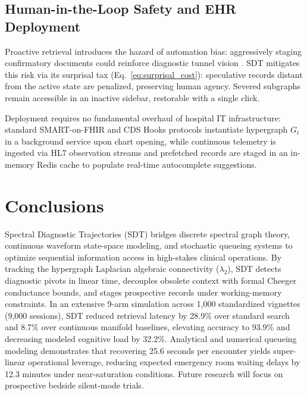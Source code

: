\documentclass[ijds,dblanonrev]{informs4}
\begin{document}
\subsection{Human-in-the-Loop Safety and EHR Deployment}
Proactive retrieval introduces the hazard of automation bias: aggressively staging confirmatory documents could reinforce diagnostic tunnel vision \citep{goddard2012automation}. SDT mitigates this risk via its surprisal tax (Eq.~\eqref{eq:surprisal_cost}): speculative records distant from the active state are penalized, preserving human agency. Severed subgraphs remain accessible in an inactive sidebar, restorable with a single click.

Deployment requires no fundamental overhaul of hospital IT infrastructure: standard SMART-on-FHIR and CDS Hooks protocols instantiate hypergraph $G_t$ in a background service upon chart opening, while continuous telemetry is ingested via HL7 observation streams and prefetched records are staged in an in-memory Redis cache to populate real-time autocomplete suggestions.

\section{Conclusions}
\label{sec:conclusions}

Spectral Diagnostic Trajectories (SDT) bridges discrete spectral graph theory, continuous waveform state-space modeling, and stochastic queueing systems to optimize sequential information access in high-stakes clinical operations. By tracking the hypergraph Laplacian algebraic connectivity ($\lambda_2$), SDT detects diagnostic pivots in linear time, decouples obsolete context with formal Cheeger conductance bounds, and stages prospective records under working-memory constraints. In an extensive 9-arm simulation across 1{,}000 standardized vignettes (9{,}000 sessions), SDT reduced retrieval latency by 28.9\% over standard search and 8.7\% over continuous manifold baselines, elevating accuracy to 93.9\% and decreasing modeled cognitive load by 32.2\%. Analytical and numerical queueing modeling demonstrates that recovering 25.6 seconds per encounter yields super-linear operational leverage, reducing expected emergency room waiting delays by 12.3 minutes under near-saturation conditions. Future research will focus on prospective bedside silent-mode trials.




\end{document}
